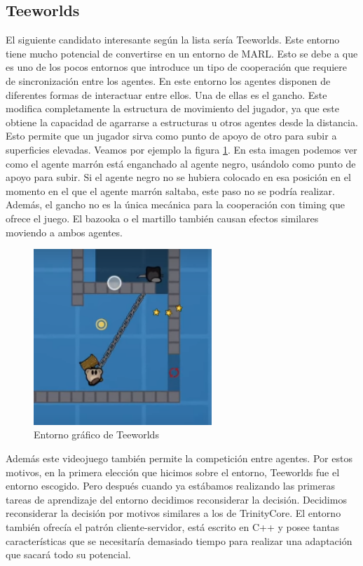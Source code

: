 \subsection{Teeworlds}

El siguiente candidato interesante según la lista sería Teeworlds. Este entorno tiene mucho potencial de convertirse en un entorno de MARL. Esto se debe a que es uno de los pocos entornos que introduce un tipo de cooperación que requiere de sincronización entre los agentes. En este entorno los agentes disponen de diferentes formas de interactuar entre ellos. Una de ellas es el gancho. Este modifica completamente la estructura de movimiento del jugador, ya que este obtiene la capacidad de agarrarse a estructuras u otros agentes desde la distancia. Esto permite que un jugador sirva como punto de apoyo de otro para subir a superficies elevadas. Veamos por ejemplo la figura \ref {fig:teeworlds-ex}. En esta imagen podemos ver como el agente marrón está enganchado al agente negro, usándolo como punto de apoyo para subir. Si el agente negro no se hubiera colocado en esa posición en el momento en el que el agente marrón saltaba, este paso no se podría realizar. Además, el gancho no es la única mecánica para la cooperación con timing que ofrece el juego. El bazooka o el martillo también causan efectos similares moviendo a ambos agentes.

\begin{figure}[ht]
    \centering
    \includegraphics[width=0.6\textwidth]{img/teewords-ex.png}
    \caption{Entorno gráfico de Teeworlds \cite {teeworlds}}
    \label{fig:teeworlds-ex}
\end{figure}

Además este videojuego también permite la competición entre agentes. Por estos motivos, en la primera elección que hicimos sobre el entorno, Teeworlds fue el entorno escogido. Pero después cuando ya estábamos realizando las primeras tareas de aprendizaje del entorno decidimos reconsiderar la decisión. Decidimos reconsiderar la decisión por motivos similares a los de TrinityCore. El entorno también ofrecía el patrón cliente-servidor, está escrito en C++ y posee tantas características que se necesitaría demasiado tiempo para realizar una adaptación que sacará todo su potencial. 

